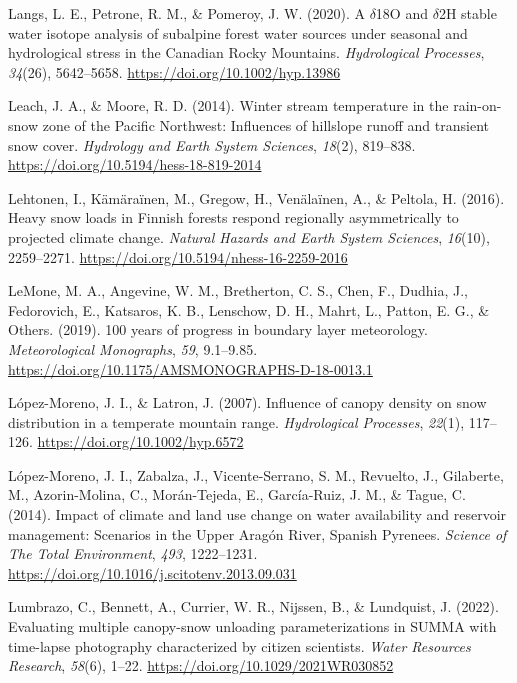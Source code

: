\documentclass[
  letterpaper,
]{tex/uofsthesis-cs}
\newlength{\cslhangindent}
\newenvironment{CSLReferences}[2] %
 {\begin{list}{}{%
  \setlength{\itemindent}{0pt}
  \setlength{\leftmargin}{0pt}
  \setlength{\parsep}{0pt}
  \ifodd #1
   \setlength{\leftmargin}{\cslhangindent}
   \setlength{\itemindent}{-1\cslhangindent}
  \fi
  \setlength{\itemsep}{#2\baselineskip}}}
 {\end{list}}
\begin{document}
\begin{CSLReferences}{1}{0}
Langs, L. E., Petrone, R. M., \& Pomeroy, J. W. (2020). A
{\(\delta\)18O} and {\(\delta\)2H} stable water isotope analysis of
subalpine forest water sources under seasonal and hydrological stress in
the {Canadian Rocky Mountains}. \emph{Hydrological Processes},
\emph{34}(26), 5642--5658. \url{https://doi.org/10.1002/hyp.13986}

Leach, J. A., \& Moore, R. D. (2014). Winter stream temperature in the
rain-on-snow zone of the {Pacific Northwest}: Influences of hillslope
runoff and transient snow cover. \emph{Hydrology and Earth System
Sciences}, \emph{18}(2), 819--838.
\url{https://doi.org/10.5194/hess-18-819-2014}

Lehtonen, I., Kämäraïnen, M., Gregow, H., Venälaïnen, A., \& Peltola, H.
(2016). Heavy snow loads in {Finnish} forests respond regionally
asymmetrically to projected climate change. \emph{Natural Hazards and
Earth System Sciences}, \emph{16}(10), 2259--2271.
\url{https://doi.org/10.5194/nhess-16-2259-2016}

LeMone, M. A., Angevine, W. M., Bretherton, C. S., Chen, F., Dudhia, J.,
Fedorovich, E., Katsaros, K. B., Lenschow, D. H., Mahrt, L., Patton, E.
G., \& Others. (2019). 100 years of progress in boundary layer
meteorology. \emph{Meteorological Monographs}, \emph{59}, 9.1--9.85.
\url{https://doi.org/10.1175/AMSMONOGRAPHS-D-18-0013.1}

López-Moreno, J. I., \& Latron, J. (2007). Influence of canopy density
on snow distribution in a temperate mountain range. \emph{Hydrological
Processes}, \emph{22}(1), 117--126.
\url{https://doi.org/10.1002/hyp.6572}

López-Moreno, J. I., Zabalza, J., Vicente-Serrano, S. M., Revuelto, J.,
Gilaberte, M., Azorin-Molina, C., Morán-Tejeda, E., García-Ruiz, J. M.,
\& Tague, C. (2014). Impact of climate and land use change on water
availability and reservoir management: {Scenarios} in the {Upper
Arag{ó}n River}, {Spanish Pyrenees}. \emph{Science of The Total
Environment}, \emph{493}, 1222--1231.
\url{https://doi.org/10.1016/j.scitotenv.2013.09.031}

Lumbrazo, C., Bennett, A., Currier, W. R., Nijssen, B., \& Lundquist, J.
(2022). Evaluating multiple canopy-snow unloading parameterizations in
{SUMMA} with time-lapse photography characterized by citizen scientists.
\emph{Water Resources Research}, \emph{58}(6), 1--22.
\url{https://doi.org/10.1029/2021WR030852}


\end{CSLReferences}
\end{document}

